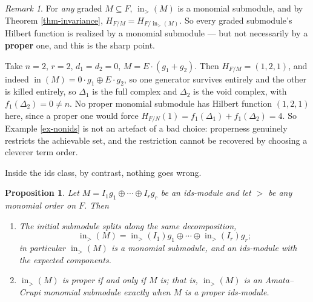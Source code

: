 \documentclass[11pt, a4paper, abstract=yes]{scrartcl}
\theoremstyle{definition}
\theoremstyle{remark}
\newtheorem{remark}[definition]{Remark}
\theoremstyle{plain}
\newtheorem{proposition}[definition]{Proposition}
\newcommand{\inn}{\operatorname{in}}
\begin{document}
\begin{remark}
\textcite{AmataCrupi2020,AmataCrupi2020KK} For \emph{any} graded \(M\subseteq F\), \(\inn_>(M)\) is a monomial
submodule, and by Theorem \ref{thm-invariance}, \(H_{F/M}=H_{F/\inn_>(M)}\). So every graded submodule's
Hilbert function is realized by a monomial submodule --- but not necessarily by a \textbf{proper} one, and
this is the sharp point.

Take \(n=2\), \(r=2\), \(d_1=d_2=0\), \(M=E\cdot(g_1+g_2)\). Then \(H_{F/M}=(1,2,1)\), and indeed
\(\inn(M)=0\cdot g_1\oplus E\cdot g_2\), so one generator survives entirely and the other is killed
entirely, so \(\Delta_1\) is the full complex and \(\Delta_2\) is the void complex, with
\(f_1(\Delta_2)=0\ne n\). No proper monomial submodule has Hilbert function \((1,2,1)\) here, since a
proper one would force \(H_{F/N}(1)=f_1(\Delta_1)+f_1(\Delta_2)=4\). So Example \ref{ex-nonids} is not an
artefact of a bad choice: properness genuinely restricts the achievable set, and the restriction
cannot be recovered by choosing a cleverer term order.
\label{rem-ac-reduction}
\end{remark}

Inside the ids class, by contrast, nothing goes wrong.

\begin{proposition}
Let \(M=I_1g_1\oplus\cdots\oplus I_rg_r\) be an ids-module and let \(>\) be \emph{any} monomial order on
\(F\). Then
\begin{enumerate}
\item The initial submodule splits along the same decomposition,
\[
     \inn_>(M)=\inn_>(I_1)g_1\oplus\cdots\oplus\inn_>(I_r)g_r ;
   \]
in particular \(\inn_>(M)\) is a monomial submodule, and an ids-module with the expected
components.
\item \(\inn_>(M)\) is proper if and only if \(M\) is; that is, \(\inn_>(M)\) is an Amata--Crupi
monomial submodule exactly when \(M\) is a proper ids-module.
\end{enumerate}
\label{prop-in-ids}
\end{proposition}
\end{document}
